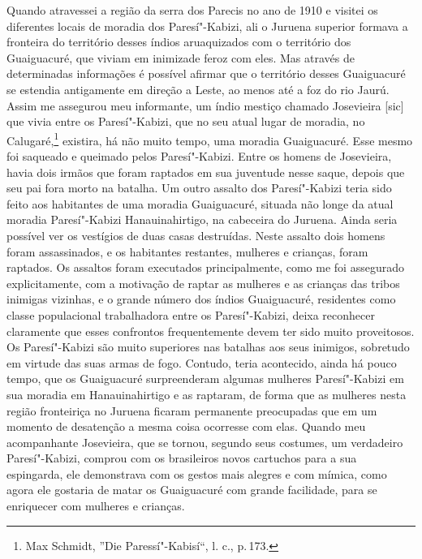 Quando atravessei a região da serra dos Parecis no ano de 1910 e visitei
os diferentes locais de moradia dos Paresí"-Kabizi, ali o Juruena
superior formava a fronteira do território desses índios aruaquizados
com o território dos Guaiguacuré, que viviam em inimizade feroz com
eles. Mas através de determinadas informações é possível afirmar que o
território desses Guaiguacuré se estendia antigamente em direção a
Leste, ao menos até a foz do rio Jaurú. Assim me assegurou meu
informante, um índio mestiço chamado Josevieira {[}sic{]} que vivia
entre os Paresí"-Kabizi, que no seu atual lugar de moradia, no
Calugaré,\footnote{Max Schmidt, ''Die Paressí"-Kabisí``, l. c., p.\,173.}
existira, há não muito tempo, uma moradia Guaiguacuré. Esse mesmo foi
saqueado e queimado pelos Paresí"-Kabizi. Entre os homens de Josevieira,
havia dois irmãos que foram raptados em sua juventude nesse saque,
depois que seu pai fora morto na batalha. Um outro assalto dos
Paresí"-Kabizi teria sido feito aos habitantes de uma moradia
Guaiguacuré, situada não longe da atual moradia Paresí"-Kabizi
Hanauinahirtigo, na cabeceira do Juruena. Ainda seria possível ver os
vestígios de duas casas destruídas. Neste assalto dois homens foram
assassinados, e os habitantes restantes, mulheres e crianças, foram
raptados. Os assaltos foram executados principalmente, como me foi
assegurado explicitamente, com a motivação de raptar as mulheres e as
crianças das tribos inimigas vizinhas, e o grande número dos índios
Guaiguacuré, residentes como classe populacional trabalhadora entre os
Paresí"-Kabizi, deixa reconhecer claramente que esses confrontos
frequentemente devem ter sido muito proveitosos. Os Paresí"-Kabizi são
muito superiores nas batalhas aos seus inimigos, sobretudo em virtude
das suas armas de fogo. Contudo, teria acontecido, ainda há pouco
tempo, que os Guaiguacuré surpreenderam algumas mulheres Paresí"-Kabizi
em sua moradia em Hanauinahirtigo e as raptaram, de forma que as
mulheres nesta região fronteiriça no Juruena ficaram permanente
preocupadas que em um momento de desatenção a mesma coisa ocorresse com
elas. Quando meu acompanhante Josevieira, que se tornou, segundo seus
costumes, um verdadeiro Paresí"-Kabizi, comprou com os brasileiros novos
cartuchos para a sua espingarda, ele demonstrava com os gestos mais
alegres e com mímica, como agora ele gostaria de matar os Guaiguacuré
com grande facilidade, para se enriquecer com mulheres e crianças.

